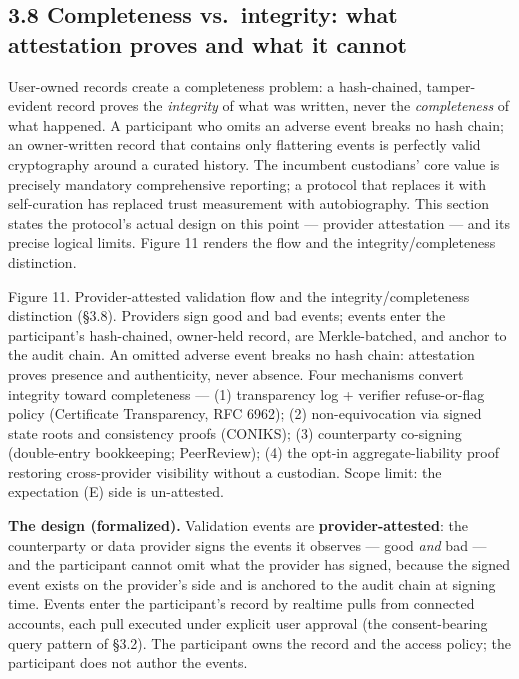 \documentclass[
]{article}
\begin{document}
\subsection{3.8 Completeness vs.~integrity: what attestation proves and
what it
cannot}\label{completeness-vs.-integrity-what-attestation-proves-and-what-it-cannot}

User-owned records create a completeness problem: a hash-chained,
tamper-evident record proves the \emph{integrity} of what was written,
never the \emph{completeness} of what happened. A participant who omits
an adverse event breaks no hash chain; an owner-written record that
contains only flattering events is perfectly valid cryptography around a
curated history. The incumbent custodians' core value is precisely
mandatory comprehensive reporting; a protocol that replaces it with
self-curation has replaced trust measurement with autobiography. This
section states the protocol's actual design on this point --- provider
attestation --- and its precise logical limits. Figure 11 renders the
flow and the integrity/completeness distinction.

Figure 11. Provider-attested validation flow and the
integrity/completeness distinction (§3.8). Providers sign good and bad
events; events enter the participant's hash-chained, owner-held record,
are Merkle-batched, and anchor to the audit chain. An omitted adverse
event breaks no hash chain: attestation proves presence and
authenticity, never absence. Four mechanisms convert integrity toward
completeness --- (1) transparency log + verifier refuse-or-flag policy
(Certificate Transparency, RFC 6962); (2) non-equivocation via signed
state roots and consistency proofs (CONIKS); (3) counterparty co-signing
(double-entry bookkeeping; PeerReview); (4) the opt-in
aggregate-liability proof restoring cross-provider visibility without a
custodian. Scope limit: the expectation ({E}) side is un-attested.

\textbf{The design (formalized).} Validation events are
\textbf{provider-attested}: the counterparty or data provider signs the
events it observes --- good \emph{and} bad --- and the participant
cannot omit what the provider has signed, because the signed event
exists on the provider's side and is anchored to the audit chain at
signing time. Events enter the participant's record by realtime pulls
from connected accounts, each pull executed under explicit user approval
(the consent-bearing query pattern of §3.2). The participant owns the
record and the access policy; the participant does not author the
events.
\end{document}
